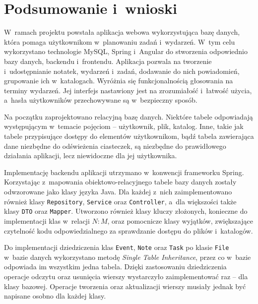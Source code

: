 \documentclass[a4paper,twoside,12pt]{book}
\newcommand{\obcy}[1]{\emph{#1}}
\newcommand{\english}[1]{{\selectlanguage{british}\obcy{#1}}}
\begin{document}
\chapter{Podsumowanie i~wnioski}


W~ramach projektu powstała aplikacja webowa wykorzystująca bazę danych, która pomaga użytkownikom w~planowaniu zadań i~wydarzeń. W~tym celu wykorzystano technologie MySQL, Spring i~Angular do stworzenia odpowiednio bazy danych, backendu i~frontendu. Aplikacja pozwala na tworzenie i~udostępnianie notatek, wydarzeń i~zadań, dodawanie do nich powiadomień, grupowanie ich w~katalogach. Wyróżnia się funkcjonalnością głosowania na terminy wydarzeń. Jej interfejs nastawiony jest na zrozumiałość i~łatwość użycia, a~hasła użytkowników przechowywane są w~bezpieczny sposób. 

Na początku zaprojektowano relacyjną bazę danych. Niektóre tabele odpowiadają występującym w~temacie pojęciom -- użytkownik, plik, katalog. Inne, takie jak tabele przypisujące dostępy do elementów użytkownikom, bądź tabela zawierająca dane niezbędne do odświeżenia ciasteczek, są niezbędne do prawidłowego działania aplikacji, lecz niewidoczne dla jej użytkownika.

Implementację backendu aplikacji utrzymano w~konwencji frameworku Spring. Korzystając z~mapowania obiektowo-relacyjnego tabele bazy danych zostały odwzorowane jako klasy języka Java. Dla każdej z~nich zaimplementowano również klasy \texttt{Repository}, \texttt{Service} oraz \texttt{Controller}, a~dla większości także klasy \texttt{DTO} oraz \texttt{Mapper}. Utworzono również klasy kluczy złożonych, konieczne do implementacji klas w~relacji $N:M$, oraz pomocnicze klasy wyjątków, zwiększające czytelność kodu odpowiedzialnego za sprawdzanie dostępu do plików i~katalogów.

Do implementacji dziedziczenia klas \texttt{Event}, \texttt{Note} oraz \texttt{Task} po klasie \texttt{File} w~bazie danych wykorzystano metodę \english{Single Table Inheritance}, przez co w~bazie odpowiada im wszystkim jedna tabela. Dzięki zastosowaniu dziedziczenia operacje odczytu oraz usunięcia wierszy wystarczyło zaimplementować raz – dla klasy bazowej. Operacje tworzenia oraz aktualizacji wierszy musiały jednak być napisane osobno dla każdej klasy.
\end{document}
